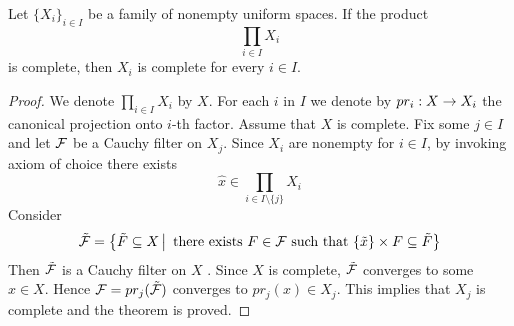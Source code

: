 \documentclass[10pt]{amsart}
\begin{document}
\begin{theorem}\label{theorem:complete_and_nonempty_product_implies_each_factor_is_complete}
	Let $\big\{X_i\big\}_{i\in I}$ be a family of nonempty uniform spaces. If the product
	$$\prod_{i\in I}X_i$$
	is complete, then $X_i$ is complete for every $i\in I$.
\end{theorem}
\begin{proof}
	We denote $\prod_{i\in I}X_i$ by $X$. For each $i$ in $I$ we denote by $pr_i:X \rightarrow X_i$ the canonical projection onto $i$-th factor. Assume that $X$ is complete. Fix some $j \in I$ and let ${\mathcal F}$ be a Cauchy filter on $X_j$. Since $X_i$ are nonempty for $i \in I$, by invoking axiom of choice there exists
	$$\hat{x} \in \prod_{i \in I\setminus \{j\}}X_i$$
	Consider
	$$\tilde{{\mathcal F}} = \big\{\tilde{F} \subseteq X\,\big|\,\mbox{ there exists }F\in {\mathcal F}\mbox{ such that }\{\tilde{x}\}\times F \subseteq \tilde{F}\big\}$$
	Then $\tilde{{\mathcal F}}$ is a Cauchy filter on $X$ . Since $X$ is complete, $\tilde{{\mathcal F}}$ converges to some $x \in X$. Hence ${\mathcal F} = pr_j(\tilde{{\mathcal F}})$ converges to $pr_j(x) \in X_j$. This implies that $X_j$ is complete and the theorem is proved.
\end{proof}
\end{document}
